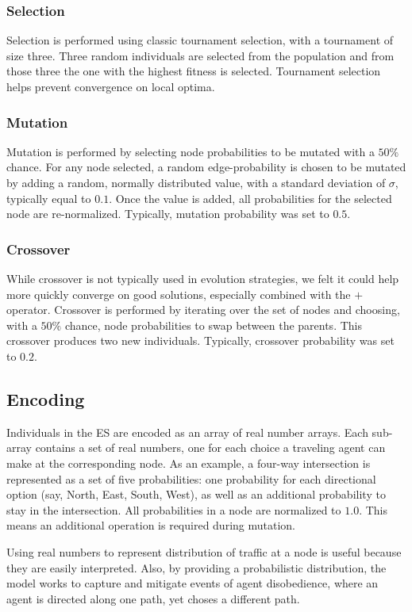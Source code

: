 \documentclass{sig-alternate-05-2015}
\begin{document}
			\subsubsection{Selection}
			Selection is performed using classic tournament selection, with a tournament of size three. Three random individuals are selected from the population and from those three the one with the highest fitness is selected. Tournament selection helps prevent convergence on local optima. 
			\subsubsection{Mutation}
			Mutation is performed by selecting node probabilities to be mutated with a $50\%$ chance. For any node selected, a random edge-probability is chosen to be mutated by adding a random, normally distributed value, with a standard deviation of $\sigma$, typically equal to $0.1$. Once the value is added, all probabilities for the selected node are re-normalized. Typically, mutation probability was set to $0.5$.
			\subsubsection{Crossover} While crossover is not typically used in evolution strategies, we felt it could help more quickly converge on good solutions, especially combined with the $+$ operator. 
			Crossover is performed by iterating over the set of nodes and choosing, with a $50\%$ chance, node probabilities to swap between the parents. This crossover produces two new individuals. Typically, crossover probability was set to $0.2$. 
		\subsection{Encoding}
			Individuals in the ES are encoded as an array of real number arrays. Each sub-array contains a set of real numbers, one for each choice a traveling agent can make at the corresponding node. As an example, a four-way intersection is represented as a set of five probabilities: one probability for each directional option (say, North, East, South, West), as well as an additional probability to stay in the intersection. All probabilities in a node are normalized to $1.0$. This means an additional operation is required during mutation.
			
			Using real numbers to represent distribution of traffic at a node is useful because they are easily interpreted. Also, by providing a probabilistic distribution, the model works to capture and mitigate events of agent disobedience, where an agent is directed along one path, yet choses a different path. 
				
\end{document}
